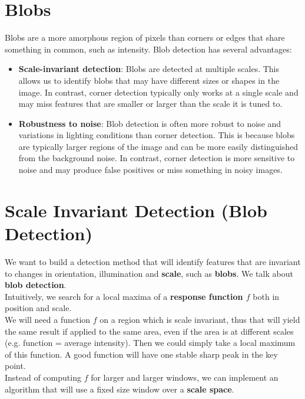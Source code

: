 \documentclass{article}
\begin{document}
\newpage

\section*{Blobs}

Blobs are a more amorphous region of pixels than corners or edges that share something in common, such as intensity. Blob detection has several advantages:

\begin{itemize}
    \item \textbf{Scale-invariant detection}: Blobs are detected at multiple scales. This allows us to identify blobs that may have different sizes or shapes in the image. In contrast, corner detection typically only works at a single scale and may miss features that are smaller or larger than the scale it is tuned to.
    \item \textbf{Robustness to noise}: Blob detection is often more robust to noise and variations in lighting conditions than corner detection. This is because blobs are typically larger regions of the image and can be more easily distinguished from the background noise. In contrast, corner detection is more sensitive to noise and may produce false positives or miss something in noisy images.
\end{itemize}


\section*{Scale Invariant Detection (Blob Detection)}

We want to build a detection method that will identify features that are invariant to changes in orientation, illumination and \textbf{scale}, such as \textbf{blobs}. We talk about \textbf{blob detection}. \\ 

Intuitively, we search for a local maxima of a \textbf{response function $f$} both in position and scale. \\

We will need a function $f$ on a region which is scale invariant, thus that will yield the same result if applied to the same area, even if the area is at different scales (e.g. function = average intensity). Then we could simply take a local maximum of this function. A good function will have one stable sharp peak in the key point. \\

Instead of computing $f$ for larger and larger windows, we can implement an algorithm that will use a fixed size window over a \textbf{scale space}. \\
\end{document}
